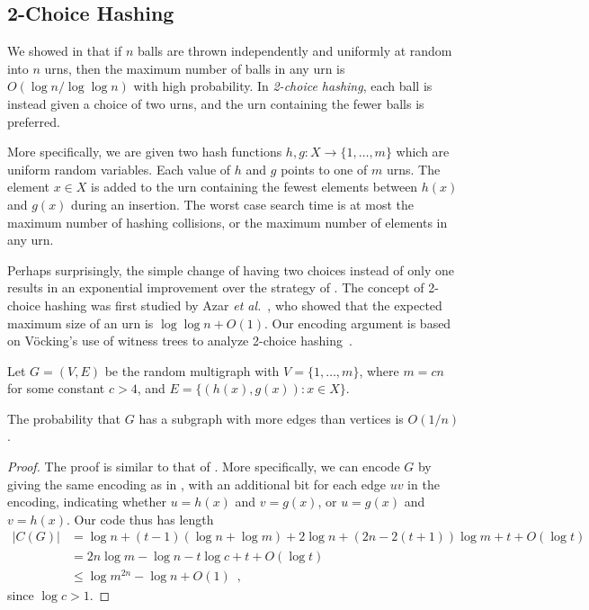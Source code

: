 \documentclass{patmorin}
\begin{document}
\subsection{2-Choice Hashing}

We showed in  that if $n$ balls are thrown independently
and uniformly at random into $n$ urns, then the maximum number of
balls in any urn is $O(\log n/\log \log n)$ with high probability. In
\emph{2-choice hashing}, each ball is instead given a choice of two
urns, and the urn containing the fewer balls is preferred.

More specifically, we are given two hash functions $h, g : X \to \{1,
\ldots, m\}$ which are uniform random variables. Each value of $h$ and
$g$ points to one of $m$ urns. The element $x \in X$ is added to the
urn containing the fewest elements between $h(x)$ and $g(x)$ during an
insertion. The worst case search time is at most the maximum number of
hashing collisions, or the maximum number of elements in any urn.

Perhaps surprisingly, the simple change of having two choices instead
of only one results in an exponential improvement over the strategy of
. The concept of 2-choice hashing was first studied by 
Azar \emph{et
  al.}~\cite{azar:multiplechoice}, who showed that the expected
maximum size of an urn is $\log \log n + O(1)$. Our encoding argument
is based on V\"{o}cking's use of witness trees to analyze 2-choice
hashing~\cite{vocking:witness}.

Let $G = (V, E)$ be the random multigraph with $V = \{1, \ldots, m\}$,
where $m = cn$ for some constant $c > 4$, and
$E = \{(h(x), g(x)) : x \in X\}$.

\begin{lem}
  The probability that $G$ has a subgraph with more edges than 
  vertices is
  $O(1/n)$.
\end{lem}
\begin{proof}
  The proof is similar to that of . More
  specifically, we can encode $G$ by giving the same encoding as in
  , with an additional bit for each edge $uv$
  in the encoding, indicating whether $u = h(x)$ and $v = g(x)$, or $u
  = g(x)$ and $v = h(x)$. Our code thus has length
  \begin{align*}
    |C(G)| &= \log n + (t - 1)(\log n + \log m) + 2 \log n + (2n - 2(t + 1))\log m + t + O(\log t) \\
           &= 2n \log m - \log n - t \log c + t + O(\log t) \\
           &\le \log m^{2n} - \log n + O(1) \enspace ,
  \end{align*}
  since $\log c > 1$.
\end{proof}
\end{document}
